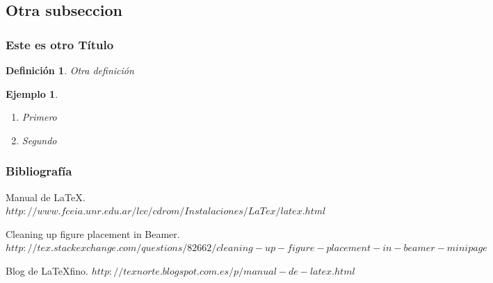 \documentclass{beamer}
\newtheorem{definicion}{Definición}
\newtheorem{ejemplo}{Ejemplo}
\begin{document}
\subsection{Otra subseccion}
\begin{frame}
\frametitle{Este es otro Título}

\begin{definicion}
  Otra definición 
\end{definicion}

\begin{ejemplo}
  \begin{enumerate}
    \item
      Primero
      \pause

    \item
      Segundo 
      \pause

  \end{enumerate}
\end{ejemplo}

\end{frame}

\begin{frame}
  \frametitle{Bibliografía}

  \begin{thebibliography}{10}

    \beamertemplatebookbibitems
    Manual de \LaTeX. {\small $http://www.fceia.unr.edu.ar/lcc/cdrom/Instalaciones/LaTex/latex.html$}

    \beamertemplatebookbibitems
    Cleaning up figure placement in Beamer. {\small $http://tex.stackexchange.com/questions/82662/cleaning-up-figure-placement-in-beamer-minipage$}

    \beamertemplatebookbibitems
    Blog de \LaTeX fino. {\small $http://texnorte.blogspot.com.es/p/manual-de-latex.html$}

  \end{thebibliography}
\end{frame}


\end{document}

